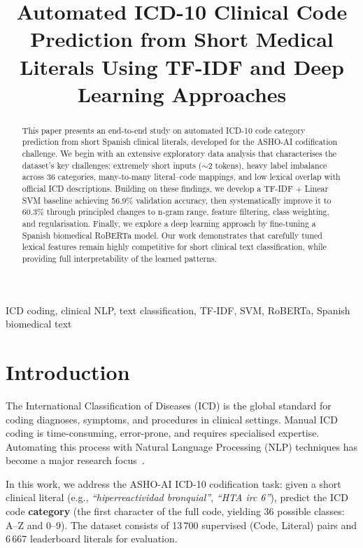 \documentclass{article}
\title{Automated ICD-10 Clinical Code Prediction from Short Medical Literals Using TF-IDF and Deep Learning Approaches}
\begin{document}
%
\maketitle
%
\begin{abstract}
This paper presents an end-to-end study on automated ICD-10 code category prediction from short Spanish clinical literals, developed for the ASHO-AI codification challenge.
We begin with an extensive exploratory data analysis that characterises the dataset's key challenges: extremely short inputs ($\sim$2 tokens), heavy label imbalance across 36 categories, many-to-many literal--code mappings, and low lexical overlap with official ICD descriptions.
Building on these findings, we develop a TF-IDF + Linear SVM baseline achieving 56.9\% validation accuracy, then systematically improve it to 60.3\% through principled changes to n-gram range, feature filtering, class weighting, and regularisation.
Finally, we explore a deep learning approach by fine-tuning a Spanish biomedical RoBERTa model. Our work demonstrates that carefully tuned lexical features remain highly competitive for short clinical text classification, while providing full interpretability of the learned patterns.
\end{abstract}
%
\begin{keywords}
ICD coding, clinical NLP, text classification, TF-IDF, SVM, RoBERTa, Spanish biomedical text
\end{keywords}
%
\section{Introduction}
\label{sec:intro}

The International Classification of Diseases (ICD) is the global standard for coding diagnoses, symptoms, and procedures in clinical settings. Manual ICD coding is time-consuming, error-prone, and requires specialised expertise. Automating this process with Natural Language Processing (NLP) techniques has become a major research focus~\cite{Dong2022}.

In this work, we address the ASHO-AI ICD-10 codification task: given a short clinical literal (e.g., \textit{``hiperreactividad bronquial''}, \textit{``HTA irc 6''}), predict the ICD code \textbf{category} (the first character of the full code, yielding 36 possible classes: A--Z and 0--9). The dataset consists of 13\,700 supervised (Code, Literal) pairs and 6\,667 leaderboard literals for evaluation.
\end{document}
